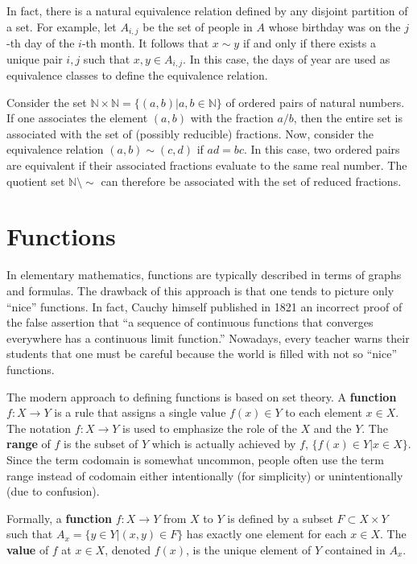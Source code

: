 In fact, there is a natural equivalence relation defined by any disjoint partition of a set.
For example, let $A_{i,j}$ be the set of people in $A$ whose birthday was on the $j$-th day of the $i$-th month.
It follows that $x\sim y$ if and only if there exists a unique pair $i,j$ such that $x,y \in A_{i,j}$.
In this case, the days of year are used as equivalence classes to define the equivalence relation.

\begin{example}
Consider the set $\mathbb{N} \times \mathbb{N} = \{ (a,b) | a,b\in\mathbb{N} \}$ of ordered pairs of natural numbers.
If one associates the element $(a,b)$ with the fraction $a/b$, then the entire set is associated with the set of (possibly reducible) fractions.
Now, consider the equivalence relation $(a,b) \sim (c,d)$ if $ad=bc$.
In this case, two ordered pairs are equivalent if their associated fractions evaluate to the same real number.
The quotient set $\mathbb{N} \setminus \!\sim$ can therefore be associated with the set of reduced fractions.
\end{example}


\section{Functions}

In elementary mathematics, functions are typically described in terms of graphs and formulas.
The drawback of this approach is that one tends to picture only ``nice'' functions.
In fact, Cauchy himself published in 1821 an incorrect proof of the false assertion that ``a sequence of continuous functions that converges everywhere has a continuous limit function.''
Nowadays, every teacher warns their students that one must be careful because the world is filled with not so ``nice'' functions.

The modern approach to defining functions is based on set theory.
A \textbf{function} $f \colon X\rightarrow Y$ is a rule that assigns a single value $f(x)\in Y$ to each element $x\in X$.
The notation $f \colon X \rightarrow Y$ is used to emphasize the role of the  $X$ and the  $Y$.
The \textbf{range} of $f$ is the subset of $Y$ which is actually achieved by $f$, $\{f(x) \in Y | x\in X \}$.
Since the term codomain is somewhat uncommon, people often use the term range instead of codomain either intentionally (for simplicity) or unintentionally (due to confusion).
\begin{definition}
Formally, a \textbf{function} $f \colon X \rightarrow Y$ from $X$ to $Y$ is defined by a subset $F \subset X \times Y$ such that $A_x = \{ y\in Y | (x,y)\in F \}$ has exactly one element for each $x\in X$.
The \textbf{value} of $f$ at $x\in X$, denoted $f(x)$, is the unique element of $Y$ contained in $A_x$.
\end{definition}

